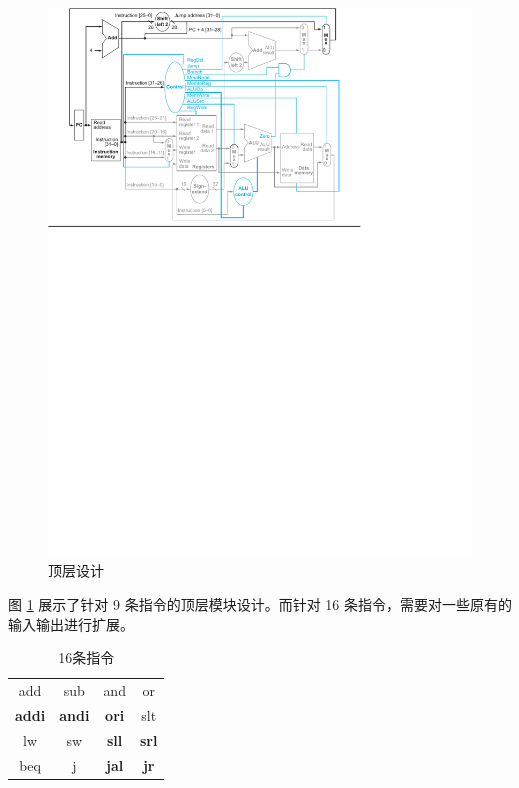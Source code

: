 \documentclass[a4paper,UTF8]{ctexart}
\begin{document}
\begin{figure}[H]
    \centering
    \includegraphics[width=\textwidth]{struct.pdf}
    \caption{顶层设计}
    \label{fig:top}
\end{figure}

图 \ref{fig:top} 展示了针对 9 条指令的顶层模块设计。而针对 16 条指令，需要对一些原有的输入输出进行扩展。

\begin{table}[H]
    \centering
    \caption{16条指令}
    \begin{tabular}{>{\sffamily}c>{\sffamily}c>{\sffamily}c>{\sffamily}c}
        \hline
        add & sub & and & or \\
        \bfseries addi & \bfseries andi & \bfseries ori & slt \\
        lw & sw & \bfseries sll & \bfseries srl \\
        beq & j &\bfseries jal &\bfseries jr \\ 
        \hline
    \end{tabular}
\end{table}
\end{document}
